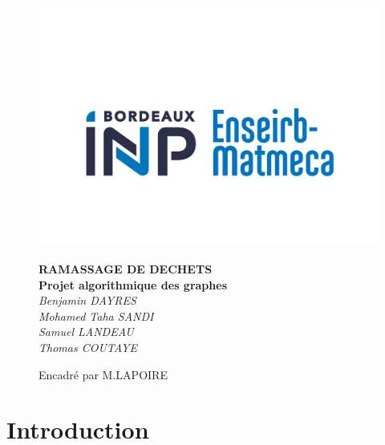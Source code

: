 \documentclass{report}
\begin{document}
\begin{titlepage}
\fancypagestyle{}{}
\begin{figure}[H]
    \centerline{\includegraphics[scale=0.4]{Logo.png}}
    \centering
	\vspace{1cm}
    {\huge\bfseries RAMASSAGE DE DECHETS \\}
    {\huge\bfseries Projet algorithmique des graphes \\}
	\vspace{2cm}
	{\Large\itshape Benjamin DAYRES \\ Mohamed Taha SANDI \\ Samuel LANDEAU \\ Thomas COUTAYE \\}
	\vspace{1cm}
	{\large Encadr\'e par M.LAPOIRE\par}
    

\end{figure}
\end{titlepage}

\newpage

\renewcommand{\contentsname}{Table des matières}
\tableofcontents

\newpage

\section{\Large Introduction }
\end{document}

